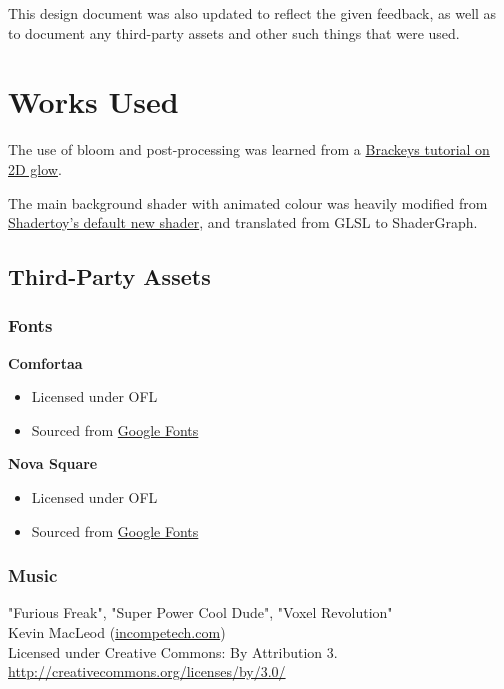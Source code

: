 \documentclass[10pt]{article}
\begin{document}
This design document was also updated to reflect the given feedback, as well as to document any third-party assets and other such things that were used.

\section{Works Used}

The use of bloom and post-processing was learned from a \href{https://www.youtube.com/watch?v=WiDVoj5VQ4c}{Brackeys tutorial on 2D glow}.

The main background shader with animated colour was heavily modified from \href{https://www.shadertoy.com/}{Shadertoy's default new shader},
and translated from GLSL to ShaderGraph.

\subsection{Third-Party Assets}

\subsubsection{Fonts}

\textbf{Comfortaa}
\begin{itemize}
    \item Licensed under OFL
    \item Sourced from \href{https://fonts.google.com/specimen/Comfortaa}{Google Fonts}
\end{itemize}

\textbf{Nova Square}
\begin{itemize}
    \item Licensed under OFL
    \item Sourced from \href{https://fonts.google.com/specimen/Nova+Square}{Google Fonts}
\end{itemize}

\subsubsection{Music}

"Furious Freak", "Super Power Cool Dude", "Voxel Revolution"\\
Kevin MacLeod (\href{https://incompetech.com}{incompetech.com})\\
Licensed under Creative Commons: By Attribution 3.\\
\url{http://creativecommons.org/licenses/by/3.0/}
\end{document}
